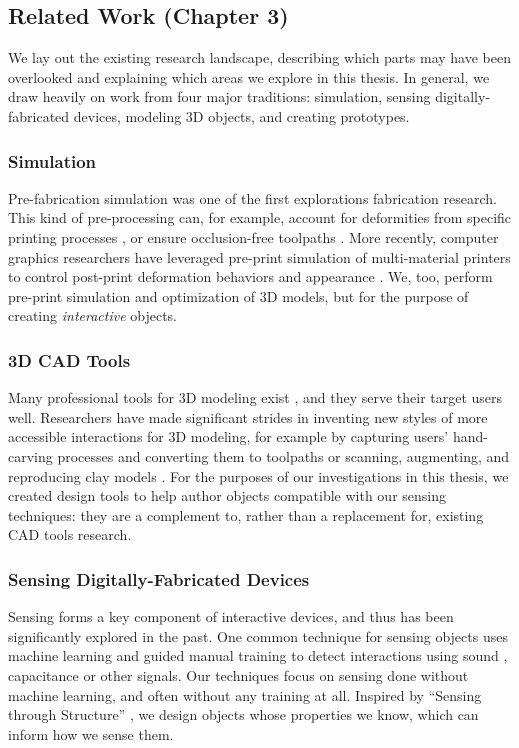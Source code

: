 \subsection{Related Work (Chapter 3)}

We lay out the existing research landscape, describing which parts may have been overlooked and explaining which areas we explore in this thesis. In general, we draw heavily on work from four major traditions: simulation, sensing digitally-fabricated devices, modeling 3D objects, and creating prototypes.

\subsubsection{Simulation}
Pre-fabrication simulation was one of the first explorations fabrication research. This kind of pre-processing can, for example, account for deformities from specific printing processes \cite{hsu-numerical}, or ensure occlusion-free toolpaths \cite{gursoz-noodles}. More recently, computer graphics researchers have leveraged pre-print simulation of multi-material printers to control post-print deformation behaviors \cite{bickel-deformation} and appearance \cite{lan-appearance}. We, too, perform pre-print simulation and optimization of 3D models, but for the purpose of creating \emph{interactive} objects.

\subsubsection{3D CAD Tools}
Many professional tools for 3D modeling exist \cite{solidworks, rhino}, and they serve their target users well. Researchers have made significant strides in inventing new styles of more accessible interactions for 3D modeling, for example by capturing users' hand-carving processes and converting them to toolpaths \cite{willis-interactive} or scanning, augmenting, and reproducing clay models \cite{savage-mmarks}. For the purposes of our investigations in this thesis, we created design tools to help author objects compatible with our sensing techniques: they are a complement to, rather than a replacement for, existing CAD tools research.

\subsubsection{Sensing Digitally-Fabricated Devices}
Sensing forms a key component of interactive devices, and thus has been significantly explored in the past. One common technique for sensing objects uses machine learning and guided manual training to detect interactions using sound \cite{ono-touchandactivate,laput-acoustruments}, capacitance \cite{sato-touche} or other signals. Our techniques focus on sensing done without machine learning, and often without any training at all. Inspired by ``Sensing through Structure'' \cite{slyper-structure}, we design objects whose properties we know, which can inform how we sense them.

